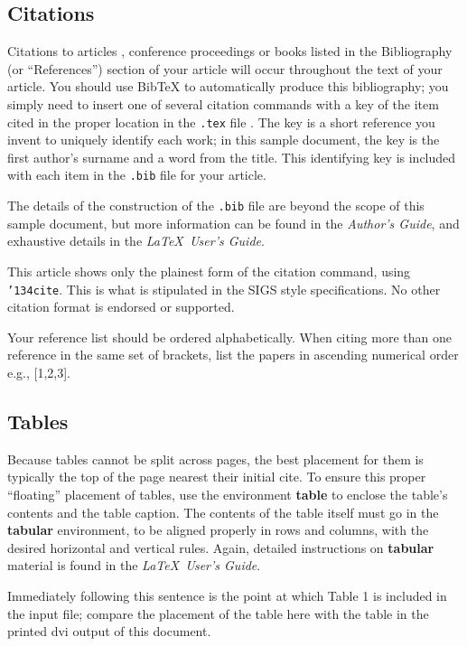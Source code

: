 \documentclass[twoside,letterpaper]{soups}
\begin{document}
\subsection{Citations}
Citations to articles \cite{bowman:reasoning,
braams:babel, clark:pct, herlihy:methodology},
conference proceedings \cite{clark:pct} or
books \cite{Lamport:LaTeX, salas:calculus} listed
in the Bibliography (or ``References'') section of your
article will occur throughout the text of your article.
You should use BibTeX to automatically produce this bibliography;
you simply need to insert one of several citation commands with
a key of the item cited in the proper location in
the \texttt{.tex} file \cite{Lamport:LaTeX}.
The key is a short reference you invent to uniquely
identify each work; in this sample document, the key is
the first author's surname and a
word from the title.  This identifying key is included
with each item in the \texttt{.bib} file for your article.

The details of the construction of the \texttt{.bib} file
are beyond the scope of this sample document, but more
information can be found in the \textit{Author's Guide},
and exhaustive details in the \textit{\LaTeX\ User's
Guide}\cite{Lamport:LaTeX}.

This article shows only the plainest form
of the citation command, using \texttt{{\char'134}cite}.
This is what is stipulated in the SIGS style specifications.
No other citation format is endorsed or supported.

Your reference list should be ordered alphabetically. When
citing more than one reference in the same set of brackets,
list the papers in ascending numerical order e.g., [1,2,3].

\subsection{Tables}
Because tables cannot be split across pages, the best
placement for them is typically the top of the page
nearest their initial cite.  To
ensure this proper ``floating'' placement of tables, use the
environment \textbf{table} to enclose the table's contents and
the table caption.  The contents of the table itself must go
in the \textbf{tabular} environment, to
be aligned properly in rows and columns, with the desired
horizontal and vertical rules.  Again, detailed instructions
on \textbf{tabular} material
is found in the \textit{\LaTeX\ User's Guide}.

Immediately following this sentence is the point at which
Table 1 is included in the input file; compare the
placement of the table here with the table in the printed
dvi output of this document.
\end{document}
